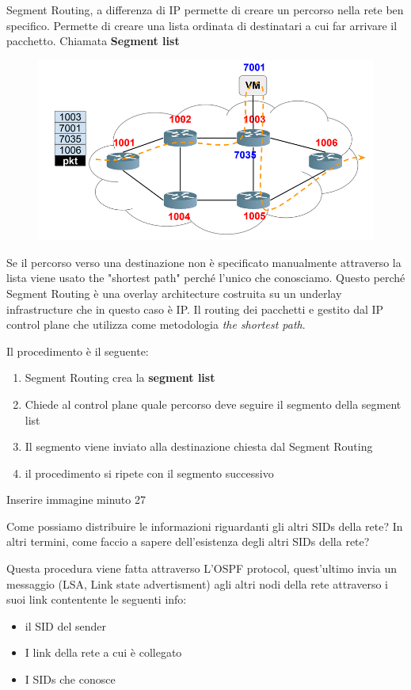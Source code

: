 \documentclass[12pt]{article}
\begin{document}
Segment Routing, a differenza di IP permette di creare un percorso nella rete ben specifico. Permette
di creare una lista ordinata  di destinatari a cui far arrivare il pacchetto. Chiamata \textbf{Segment list}

\begin{figure}[h]
    \includegraphics*[scale = 0.3]{F2.png}
    \centering
\end{figure}

Se il percorso verso una destinazione non è specificato manualmente attraverso la lista viene usato the "shortest path" perché l'unico che conosciamo. 
Questo perché Segment Routing è una overlay architecture costruita su un underlay infrastructure che in questo caso è IP. 
Il routing dei pacchetti e gestito dal IP control plane che utilizza come metodologia \textit{the shortest path}. 

Il procedimento è il seguente: 
\begin{enumerate}
    \item Segment Routing crea la \textbf{segment list}
    \item Chiede al control plane quale percorso deve seguire il segmento della segment list
    \item Il segmento viene inviato alla destinazione chiesta dal Segment Routing
    \item il procedimento si ripete con il segmento successivo
\end{enumerate}

Inserire immagine minuto 27

Come possiamo distribuire le informazioni riguardanti gli altri SIDs della rete? In altri termini, come faccio
a sapere dell'esistenza degli altri SIDs della rete?

Questa procedura viene fatta attraverso L'OSPF protocol, quest'ultimo invia un messaggio (LSA, Link state advertisment) agli altri nodi
della rete attraverso i suoi link contentente le seguenti info: 
\begin{itemize}
    \item il SID del sender
    \item I link della rete a cui è collegato
    \item I SIDs che conosce
\end{itemize}  
\end{document}
